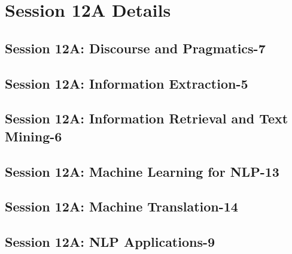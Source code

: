 \section{Session 12A Details}
\subsection{\large Session 12A: Discourse and Pragmatics-7}
\label{parallel-session-12A-trackA}
\TrackALoc\hfill\sessionchair{}{}
\clearpage
\subsection{\large Session 12A: Information Extraction-5}
\label{parallel-session-12A-trackB}
\TrackBLoc\hfill\sessionchair{}{}
\clearpage
\subsection{\large Session 12A: Information Retrieval and Text Mining-6}
\label{parallel-session-12A-trackC}
\TrackCLoc\hfill\sessionchair{}{}
\clearpage
\subsection{\large Session 12A: Machine Learning for NLP-13}
\label{parallel-session-12A-trackD}
\TrackDLoc\hfill\sessionchair{}{}
\clearpage
\subsection{\large Session 12A: Machine Translation-14}
\label{parallel-session-12A-trackE}
\TrackELoc\hfill\sessionchair{}{}
\clearpage
\subsection{\large Session 12A: NLP Applications-9}
\label{parallel-session-12A-trackF}
\TrackFLoc\hfill\sessionchair{}{}
\clearpage
